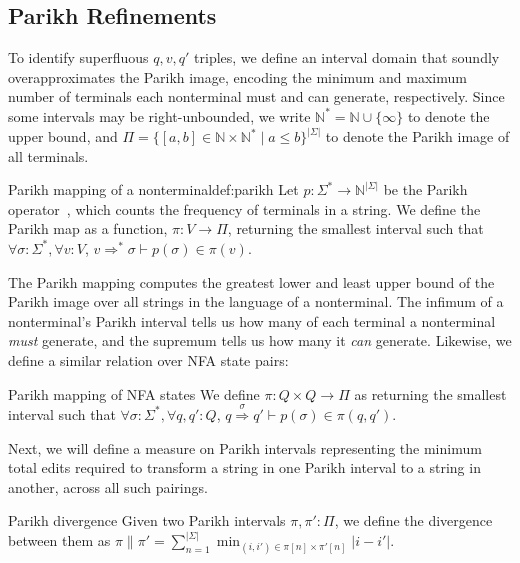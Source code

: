 \subsection{Parikh Refinements}

To identify superfluous $q, v, q'$ triples, we define an interval domain that soundly overapproximates the Parikh image, encoding the minimum and maximum number of terminals each nonterminal must and can generate, respectively. Since some intervals may be right-unbounded, we write $\mathbb{N}^*=\mathbb{N} \cup \{\infty\}$ to denote the upper bound, and $\Pi = \{[a, b] \in \mathbb{N} \times \mathbb{N}^* \mid a \leq b\}^{|\Sigma|}$ to denote the Parikh image of all terminals.

\begin{definition}{Parikh mapping of a nonterminal}{def:parikh}
Let $p: \Sigma^*\rightarrow\mathbb{N}^{|\Sigma|}$ be the Parikh operator~\cite{parikh1966context}, which counts the frequency of terminals in a string. We define the Parikh map as a function, $\pi: V \rightarrow \Pi$, returning the smallest interval such that $\forall \sigma: \Sigma^*, \forall v: V$, $v \Rightarrow^* \sigma \vdash p(\sigma) \in \pi(v)$.
\end{definition}

The Parikh mapping computes the greatest lower and least upper bound of the Parikh image over all strings in the language of a nonterminal. The infimum of a nonterminal's Parikh interval tells us how many of each terminal a nonterminal \textit{must} generate, and the supremum tells us how many it \textit{can} generate. Likewise, we define a similar relation over NFA state pairs:

\begin{definition}{Parikh mapping of NFA states}{}
  We define $\pi: Q\times Q \rightarrow \Pi$ as returning the smallest interval such that $\forall \sigma: \Sigma^*, \forall q, q': Q$, $q \overset{\sigma}{\Longrightarrow} q' \vdash p(\sigma) \in \pi(q, q')$.
\end{definition}

Next, we will define a measure on Parikh intervals representing the minimum total edits required to transform a string in one Parikh interval to a string in another, across all such pairings.

\begin{definition}{Parikh divergence}{}
  Given two Parikh intervals $\pi, \pi': \Pi$, we define the divergence between them as $\pi \parallel \pi' = \sum_{n=1}^{|\Sigma|} \min_{(i, i') \in \pi[n]\times \pi'[n]} |i - i'|$.
\end{definition}

